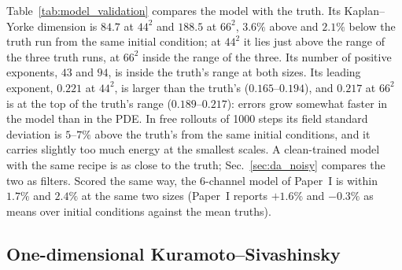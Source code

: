Table~\ref{tab:model_validation} compares the model with the truth.
Its Kaplan--Yorke dimension is $84.7$ at $44^2$ and $188.5$ at $66^2$, $3.6\%$ above
and $2.1\%$ below the truth run from the same initial condition; at $44^2$ it
lies just above the range of the three truth runs, at $66^2$ inside the
range of the three. Its number of positive exponents, $43$ and $94$, is inside
the truth's range at both sizes. Its leading exponent, $0.221$ at $44^2$, is
larger than the truth's ($0.165$--$0.194$), and $0.217$ at $66^2$ is at the top of the
truth's range ($0.189$--$0.217$): errors grow somewhat faster in the model than in the PDE. In free rollouts of 1000 steps
its field standard deviation is $5$--$7\%$ above the truth's from the same
initial conditions, and it carries slightly too much energy at the
smallest scales. A clean-trained model with the same recipe is as close to
the truth; Sec.~\ref{sec:da_noisy} compares the two as filters. Scored the
same way, the 6-channel model of Paper~I is within $1.7\%$ and $2.4\%$ at the
same two sizes (Paper~I reports $+1.6\%$ and $-0.3\%$ as means over initial
conditions against the mean truths).

\begin{table}[htbp]
\caption{Validation of the 12-channel 2D KS models against the PDE. The
model's Kaplan--Yorke dimension, leading exponent $\lambda_1$ and number of
positive exponents $n_+$ are from one initial condition (seed 0); the error is
relative to the truth run from the same initial condition, and the truth
columns give the range over the independent truth runs (three at $44^2$, three
at $66^2$). Free rollout: field standard deviation (field units) and the share
of energy at $|\bm k|\ge1.4$ (\%), model / truth, from two initial conditions,
steps 100--1000 of 1000. Noisy-trained: the model of every experiment in
this paper.}
\label{tab:model_validation}
\end{table}

\subsection{One-dimensional Kuramoto--Sivashinsky}
\label{sec:ks1d}

